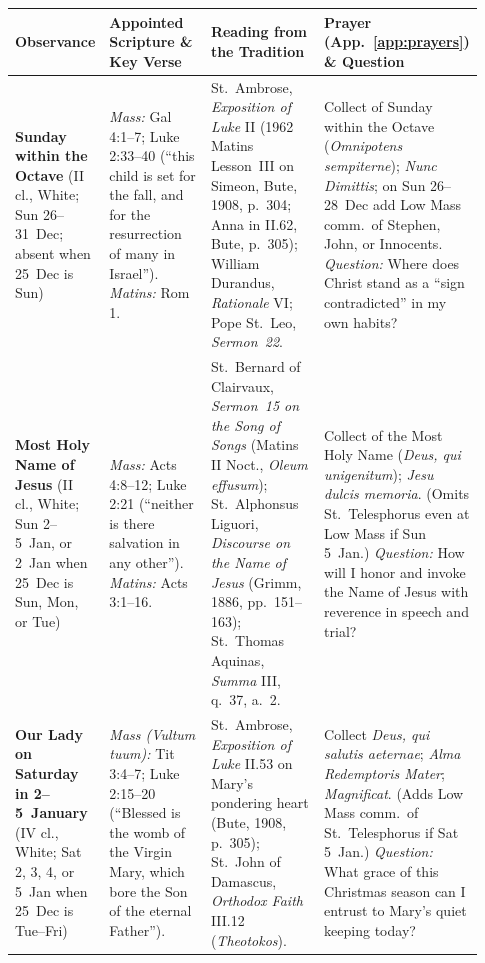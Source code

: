 {\footnotesize
\begin{longtable}{>{\raggedright\arraybackslash}p{0.15\linewidth}>{\raggedright\arraybackslash}p{0.25\linewidth}>{\raggedright\arraybackslash}p{0.27\linewidth}>{\raggedright\arraybackslash}p{0.26\linewidth}}
\toprule
\textbf{Observance} & \textbf{Appointed Scripture \& Key Verse} & \textbf{Reading from the Tradition} & \textbf{Prayer (App.~\ref{app:prayers}) \& Question}\\
\midrule
\endhead
\textbf{Sunday within the Octave} (II cl., White; Sun 26--31~Dec; absent when 25~Dec is Sun) & \textit{Mass:} Gal 4:1--7; Luke 2:33--40 (``this child is set for the fall, and for the resurrection of many in Israel''). \textit{Matins:} Rom 1. & St.~Ambrose, \textit{Exposition of Luke} II (1962 Matins Lesson~III on Simeon, Bute, 1908, p.~304; Anna in II.62, Bute, p.~305); William Durandus, \textit{Rationale} VI; Pope St.~Leo, \textit{Sermon~22}. & Collect of Sunday within the Octave (\textit{Omnipotens sempiterne}); \textit{Nunc Dimittis}; on Sun 26--28~Dec add Low Mass comm.\ of Stephen, John, or Innocents. \textit{Question:} Where does Christ stand as a ``sign contradicted'' in my own habits?\\
\textbf{Most Holy Name of Jesus} (II cl., White; Sun 2--5~Jan, or 2~Jan when 25~Dec is Sun, Mon, or Tue) & \textit{Mass:} Acts 4:8--12; Luke 2:21 (``neither is there salvation in any other''). \textit{Matins:} Acts 3:1--16. & St.~Bernard of Clairvaux, \textit{Sermon~15 on the Song of Songs} (Matins II Noct., \textit{Oleum effusum}); St.~Alphonsus Liguori, \textit{Discourse on the Name of Jesus} (Grimm, 1886, pp.~151--163); St.~Thomas Aquinas, \textit{Summa} III, q.~37, a.~2. & Collect of the Most Holy Name (\textit{Deus, qui unigenitum}); \textit{Jesu dulcis memoria}. (Omits St.~Telesphorus even at Low Mass if Sun 5~Jan.) \textit{Question:} How will I honor and invoke the Name of Jesus with reverence in speech and trial?\\
\textbf{Our Lady on Saturday in 2--5~January} (IV cl., White; Sat 2, 3, 4, or 5~Jan when 25~Dec is Tue--Fri) & \textit{Mass (Vultum tuum):} Tit 3:4--7; Luke 2:15--20 (``Blessed is the womb of the Virgin Mary, which bore the Son of the eternal Father''). & St.~Ambrose, \textit{Exposition of Luke} II.53 on Mary's pondering heart (Bute, 1908, p.~305); St.~John of Damascus, \textit{Orthodox Faith} III.12 (\textit{Theotokos}). & Collect \textit{Deus, qui salutis aeternae}; \textit{Alma Redemptoris Mater}; \textit{Magnificat}. (Adds Low Mass comm.\ of St.~Telesphorus if Sat 5~Jan.) \textit{Question:} What grace of this Christmas season can I entrust to Mary's quiet keeping today?\\
\bottomrule
\end{longtable}
}
